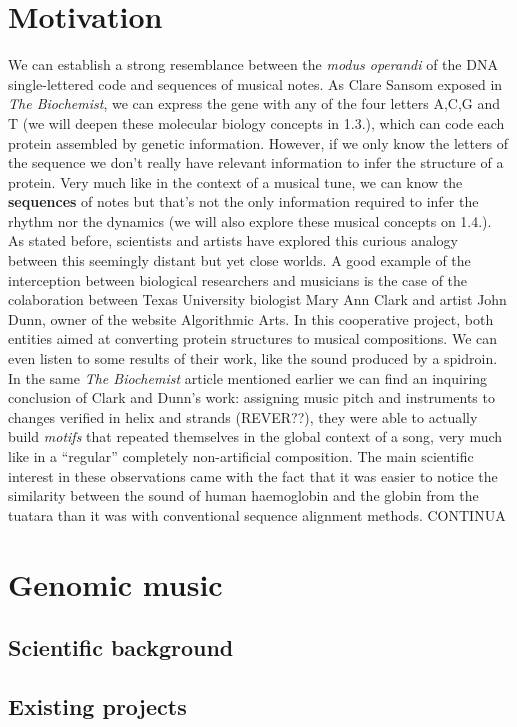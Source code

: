 \documentclass[11pt,twoside,a4paper]{report}
\begin{document}
\section{Motivation}
We can establish a strong resemblance between the \textit{modus operandi} of the DNA single-lettered code and sequences of musical notes. As Clare Sansom exposed in \textit{The Biochemist}\cite{cyberbio}, we can express the gene with any of the four letters A,C,G and T (we will deepen these molecular biology concepts in 1.3.), which can code each protein assembled by genetic information. However, if we only know the letters of the sequence we don't really have relevant information to infer the structure of a protein. Very much like in the context of a musical tune, we can know the \textbf{sequences} of notes but that's not the only information required to infer the rhythm nor the dynamics (we will also explore these musical concepts on 1.4.).  
As stated before, scientists and artists have explored this curious analogy between this seemingly distant but yet close worlds. A good example of the interception between biological researchers and musicians is the case of the colaboration between Texas University biologist Mary Ann Clark and artist John Dunn, owner of the website Algorithmic Arts\cite{algoart}. In this cooperative project, both entities aimed at converting protein structures to musical compositions. We can even listen to some results of their work, like the sound produced by a spidroin. In the same \textit{The Biochemist} article mentioned earlier we can find an inquiring conclusion of Clark and Dunn's work: assigning music pitch and instruments to changes verified in helix and strands (REVER??), they were able to actually build \textit{motifs} that repeated themselves in the global context of a song, very much like in a ``regular'' completely non-artificial composition. The main scientific interest in these observations came with the fact that it was easier to notice the similarity between the sound of human haemoglobin and the globin from the tuatara than it was with conventional sequence alignment methods. 
CONTINUA

\section{Genomic music}
\subsection{Scientific background}
\subsection{Existing projects}
\end{document}
